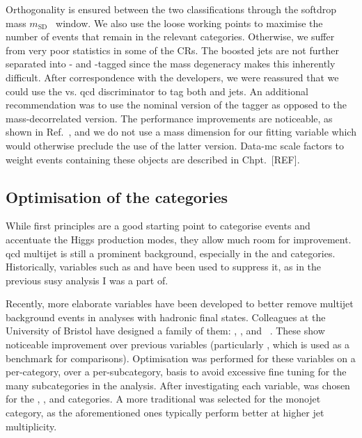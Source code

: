 \medskip

\noindent{}Orthogonality is ensured between the two classifications through the softdrop mass $m_{\mathrm{SD}}$~\cite{Larkoski:2014wba} window. We also use the loose working points to maximise the number of events that remain in the relevant categories. Otherwise, we suffer from very poor statistics in some of the \glspl{CR}. The boosted \PVec \glspl{jet} are not further separated into \PW- and \PZ-tagged since the mass degeneracy makes this inherently difficult. After correspondence with the \deepakeight developers, we were reassured that we could use the \PW vs. \acrshort{qcd} discriminator to tag both \PW and \PZ \glspl{jet}. An additional recommendation was to use the nominal version of the tagger as opposed to the mass-decorrelated version. The performance improvements are noticeable, as shown in Ref.~, and we do not use a mass dimension for our fitting variable which would otherwise preclude the use of the latter version. Data-\acrshort{mc} scale factors to weight events containing these objects are described in Chpt.~[REF].




\subsection{Optimisation of the categories}
\label{subsec:htoinv_cat_optimisation}


While first principles are a good starting point to categorise events and accentuate the Higgs production modes, they allow much room for improvement. \acrshort{qcd} multijet is still a prominent background, especially in the \ttH and \ggF categories. Historically, variables such as \biasedDPhi and \alphat have been used to suppress it, as in the previous \acrlong{susy} analysis I was a part of.

Recently, more elaborate variables have been developed to better remove multijet background events in analyses with hadronic final states. Colleagues at the University of Bristol have designed a family of them: \minChi, \omegaHat, and \omegaTilde~\cite{Sakuma:2018xrq}. These show noticeable improvement over previous variables (particularly \biasedDPhi, which is used as a benchmark for comparisons). Optimisation was performed for these variables on a per-category, over a per-subcategory, basis to avoid excessive fine tuning for the many subcategories in the analysis. After investigating each variable, \omegaTilde was chosen for the \ttH, \VH, and \ggF categories. A more traditional \mindphiJetMet was selected for the monojet category, as the aforementioned ones typically perform better at higher \gls{jet} multiplicity.

